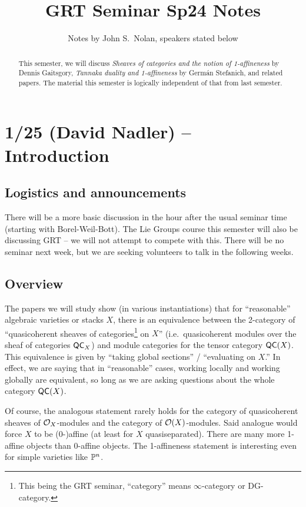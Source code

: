 \documentclass{article}
\title{GRT Seminar Sp24 Notes}
\author{Notes by John S.\ Nolan, speakers stated below}
\begin{document}
\maketitle

\begin{abstract}
	This semester, we will discuss \emph{Sheaves of categories and the notion of 1-affineness} by Dennis Gaitsgory, \emph{Tannaka duality and 1-affineness} by Germ\'an Stefanich, and related papers.
	The material this semester is logically independent of that from last semester.
\end{abstract}

\tableofcontents

\section{1/25 (David Nadler) -- Introduction}

\subsection{Logistics and announcements}

There will be a more basic discussion in the hour after the usual seminar time (starting with Borel-Weil-Bott).
The Lie Groups course this semester will also be discussing GRT -- we will not attempt to compete with this.
There will be no seminar next week, but we are seeking volunteers to talk in the following weeks.

\subsection{Overview}

The papers we will study show (in various instantiations) that for ``reasonable'' algebraic varieties or stacks $X$, there is an equivalence between the 2-category of ``quasicoherent sheaves of categories\footnote{This being the GRT seminar, ``category'' means $\infty$-category or DG-category.} on $X$'' (i.e.\ quasicoherent modules over the sheaf of categories $\mathsf{QC}_X$) and module categories for the tensor category $\mathsf{QC}(X)$.
This equivalence is given by ``taking global sections'' / ``evaluating on $X$.''
In effect, we are saying that in ``reasonable'' cases, working locally and working globally are equivalent, so long as we are asking questions about the whole category $\mathsf{QC}(X)$.

Of course, the analogous statement rarely holds for the category of quasicoherent sheaves of $\mathcal{O}_X$-modules and the category of $\mathcal{O}(X)$-modules.
Said analogue would force $X$ to be (0-)affine (at least for $X$ quasiseparated).
There are many more 1-affine objects than 0-affine objects.
The 1-affineness statement is interesting even for simple varieties like $\mathbb{P}^n$.
\end{document}
